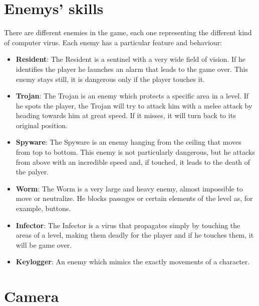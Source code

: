 \documentclass[12pt, a4paper]{report}
\begin{document}
\section*{Enemys' skills}
There are different enemies in the game, each one representing the different kind of computer virus. Each enemy has a particular feature and behaviour:
\begin{itemize}
	\item \textbf{Resident}: The Resident is a sentinel with a very wide field of vision. If he identifies the player he launches an alarm that leads to the game 		over. This enemy stays still, it is dangerous only if the player touches it.
	\item \textbf{Trojan}: The Trojan is an enemy which protects a specific area in a level. If he spots the player, the Trojan will try to attack him with a 			melee attack by heading towards him at great speed. If it misses, it will turn back to its original position.
	\item \textbf{Spyware}: The Spyware is an enemy hanging from the ceiling that moves from top to bottom. This enemy is not particularly dangerous, but 	he attacks from above with an incredible speed and, if touched, it leads to the death of the palyer.
	\item \textbf{Worm}: The Worm is a very large and heavy enemy, almost impossible to move or neutralize. He blocks passages or certain elements of 		the level as, for example, buttons.
	\item \textbf{Infector}: The Infector is a virus that propagates simply by touching the areas of a level, making them deadly for the player and if he 			touches them, it will be game over.
	\item \textbf{Keylogger}: An enemy which mimics the exactly movements of a character.
\end{itemize}




\section*{Camera}
\end{document}
